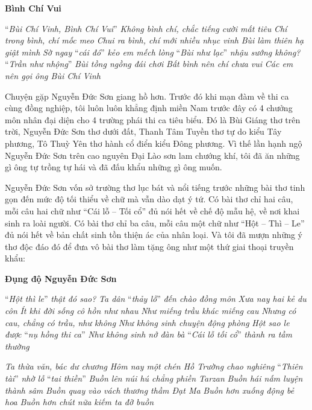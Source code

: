 \documentclass[../main.tex]{subfiles}
\begin{document}
\begin{multicols}{2}
\begin{blockquote}
\textbf{Bình Chí Vui} 
        
“\textit{Bùi Chí Vinh, Bình Chí Vui}”        
\textit{Không bình chí, chắc tiếng cười mất tiêu}        
\textit{Chí trong bình, chí mốc meo}        
\textit{Chui ra bình, chí mới nhiều nhục vinh}        
\textit{Bùi làm thiên hạ giật mình}        
\textit{Sờ ngay }“\textit{cái đó}” \textit{kẻo em mếch lòng}        
“\textit{Bùi như lạc}” \textit{nhậu sướng không?}        
“\textit{Trần như nhộng}”\textit{ Bùi tồng ngồng đái chơi}        
\textit{Bất bình nên chí chưa vui} 
\textit{Các em nên gọi ông Bùi Chí Vinh} 

\end{blockquote}
 
Chuyện gặp Nguyễn Ðức Sơn giang hồ hơn. Trước đó khi mạn đàm về thi ca cùng đồng nghiệp, tôi luôn luôn khẳng định miền Nam trước đây có 4 chưởng môn nhân đại diện cho 4 trường phái thi ca tiêu biểu. Ðó là Bùi Giáng thơ trên trời, Nguyễn Ðức Sơn thơ dưới đất, Thanh Tâm Tuyền thơ tự do kiểu Tây phương, Tô Thuỳ Yên thơ hành cổ điển kiểu Ðông phương. Vì thế lần hạnh ngộ Nguyễn Ðức Sơn trên cao nguyên Ðại Lào sơn lam chướng khí, tôi đã ăn những gì ông tự trồng tự hái và đã đấu khẩu những gì ông muốn. 
 
Nguyễn Ðức Sơn vốn sở trường thơ lục bát và nổi tiếng trước những bài thơ tinh gọn đến mức độ tối thiểu về chữ mà vẫn dào dạt ý tứ. Có bài thơ chỉ hai câu, mỗi câu hai chữ như “Cái lỗ – Tối cổ” đủ nói hết về chế độ mẫu hệ, về nơi khai sinh ra loài người. Có bài thơ chỉ ba câu, mỗi câu một chữ như “Hột – Thì – Le” đủ nói hết về bản chất sinh tồn thiện ác của nhân loại. Và tôi đã mượn những ý thơ độc đáo đó để đưa vô bài thơ làm tặng ông như một thứ giai thoại truyền khẩu: 
\begin{blockquote}
 
\textbf{Ðụng độ Nguyễn Ðức Sơn} 
        
“\textit{Hột thì le}” \textit{thật đó sao?}        
\textit{Ta dân }“\textit{thảy lỗ}” \textit{đến chào đồng môn}        
\textit{Xưa nay hai kẻ du côn}        
\textit{Ít khi đời sống cô hồn như nhau}        
\textit{Như miếng trầu khác miếng cau}        
\textit{Nhưng có cau, chẳng có trầu, như không}        
\textit{Như không sinh chuyện động phòng}        
\textit{Hột sao le được }“\textit{nụ hồng thi ca}”        
\textit{Như không sinh nở đàn bà} 
“\textit{Cái lỗ tối cổ}” \textit{thành ra tầm thường} 
        
\textit{Ta thừa văn, bác dư chương}        
\textit{Hôm nay một chén Hồ Trường chao nghiêng}        
“\textit{Thiên tài}”\textit{ nhờ lỗ }“\textit{tai thiền}”        
\textit{Buồn lên núi hú chẳng phiền Tarzan}        
\textit{Buồn hái nấm luyện thành sâm}        
\textit{Buồn quay vào vách thương thầm Ðạt Ma}        
\textit{Buồn hơn xuống động bẻ hoa} 
\textit{Buồn hơn chút nữa kiếm ta đỡ buồn} 
        

\end{blockquote}
\end{multicols}
\end{document}
